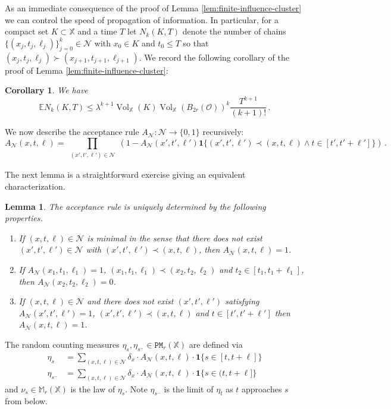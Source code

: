 \documentclass[11pt]{amsart}
\newtheorem{lemma}[theorem]{Lemma}
\newtheorem{corollary}[theorem]{Corollary}
\theoremstyle{definition}
\theoremstyle{remark}
\newcommand{\EE}{\mathbb{E}}
\newcommand{\M}{\mathbb{M}}
\newcommand{\bX}{\mathbb{X}}
\newcommand{\cP}{\mathtt{PM}}
\newcommand{\Vol}{\operatorname{Vol}}
\newcommand{\one}{\mathbf{1}}
\begin{document}
As an immediate consequence of the proof of Lemma \ref{lem:finite-influence-cluster} we can control the speed of propagation of information.  In particular, for a compact set $K \subset \bX$ and a time $T$ let $N_k(K,T)$ denote the number of chains $\{(x_j,t_j,\ell_j)\}_{j = 0}^k \in \mathcal{N}$ with $x_0 \in K$ and $t_0 \leq T$ so that $(x_j,t_j,\ell_j) \succ (x_{j+1},t_{j+1},\ell_{j+1})$.  We record the following corollary of the proof of Lemma \ref{lem:finite-influence-cluster}: \begin{corollary}\label{cor:finite-propagation-backwards}
	We have \begin{equation*}
		\EE N_k(K,T) \leq \lambda^{k+1} \Vol_\bX(K) \Vol_{\bX}(B_{2r}(\mathcal{O}))^k \frac{T^{k+1}}{(k+1)!}\,.
	\end{equation*}
\end{corollary}


We now describe the acceptance rule $A_{\mathcal{N}}:\mathcal{N} \to \{0,1\}$ recursively: \begin{equation}\label{eq:acceptance-rule}
	A_{\mathcal{N}}(x,t,\ell) = \prod_{\substack{(x',t',\ell') \in \mathcal{N}}} (1 - A_{\mathcal{N}}(x',t',\ell')\one\{(x',t',\ell') \prec (x,t,\ell) \wedge t\in[t',t'+\ell']\} )\,.
\end{equation}

The next lemma is a straightforward exercise giving an equivalent characterization.
\begin{lemma}
	The acceptance rule is uniquely determined by the following properties.
	\begin{enumerate}
		\item If $(x,t,\ell)\in \mathcal{N}$ is minimal in the sense that there does not exist $(x',t',\ell')\in \mathcal{N}$ with $(x',t',\ell') \prec (x,t,\ell)$, then $A_{\mathcal{N}}(x,t,\ell) =1$.
		\item If $A_{\mathcal{N}}(x_1,t_1,\ell_1)=1$, $(x_1,t_1,\ell_1) \prec (x_2,t_2,\ell_2)$ and $t_2 \in [t_1,t_1+\ell_1]$, then $A_{\mathcal{N}}(x_2,t_2,\ell_2) =0$.
		\item If $(x,t,\ell)\in \mathcal{N}$ and there does not exist $(x',t',\ell')$ satisfying $A_{\mathcal{N}}(x',t',\ell')=1$, $(x',t',\ell') \prec (x,t,\ell)$ and $t \in [t',t'+\ell']$ then $A_{\mathcal{N}}(x,t,\ell) =1$.
	\end{enumerate}
\end{lemma}

The random counting measures $\eta_s, \eta_{s^-} \in \cP_{r}(\bX)$ are defined via \begin{eqnarray}
	\eta_s &= \sum_{(x,t,\ell) \in \mathcal{N}} \delta_x \cdot A_{\mathcal{N}}(x,t,\ell)  \cdot \one\{ s \in [t,t+\ell] \}\label{eq:nu-s-formal-def}\\
	\eta_{s^-} &= \sum_{(x,t,\ell) \in \mathcal{N}} \delta_x \cdot A_{\mathcal{N}}(x,t,\ell)  \cdot \one\{ s \in (t,t+\ell] \} \nonumber
\end{eqnarray}
and $\nu_s \in \M_r(\bX)$ is the law of $\eta_s$. Note $\eta_{s^-}$ is the limit of $\eta_t$ as $t$ approaches $s$ from below. 
\end{document}
